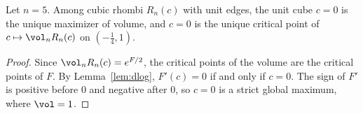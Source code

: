 \begin{theorem}\label{thm:main}
Let $n=5$. Among cubic rhombi $R_n(c)$ with unit edges, the unit cube $c=0$ is the unique maximizer of volume, and $c=0$ is the unique critical point of $c\mapsto\vol_nR_n(c)$ on $(- \frac{1}{4},1)$.
\end{theorem}
\begin{proof}
Since $\vol_nR_n(c)=e^{F/2}$, the critical points of the volume are the critical points of $F$.
By Lemma~\ref{lem:dlog}, $F'(c)=0$ if and only if $c=0$.
The sign of $F'$ is positive before $0$ and negative after $0$, so $c=0$ is a strict global maximum, where $\vol=1$.
\end{proof}
